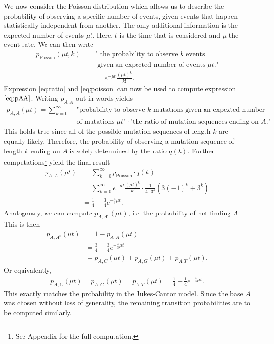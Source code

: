 \documentclass[12pt]{article}
\begin{document}
We now consider the Poisson distribution which allows us to describe the probability of observing a specific number of events, given events that happen statistically independent from another. The only additional information is the expected number of events $\mu t$. Here, $t$ is the time that is considered and $\mu$ the event rate. We can then write
\begin{align}
p_{\text{Poisson}}(\mu t,k) = &\text{" the probability to observe }k\text{ events}\nonumber\\
&\text{ given an expected number of events }\mu t\text{."} \nonumber \\
&= e^{-\mu t}\frac{(\mu t)^k}{k!} \label{eq:poisson}.
\end{align}
Expression \eqref{eq:ratio} and \eqref{eq:poisson} can now be used to compute expression $\eqref{eq:pAA}$. Writing $p_{A,A}$ out in words yields
\begin{align}
	p_{A,A}(\mu t) = \sum_{k=0}^\infty &\text{ "probability to observe $k$ mutations given an expexted number}\nonumber \\  &\text{  of mutations $\mu t$"} \nonumber
	 \cdot \text{"the ratio of mutation sequences ending on $A$."}
\end{align}
This holds true since all of the possible mutation sequences of length $k$ are equally likely. Therefore, the probability of observing a mutation sequence of length $k$ ending on $A$ is solely determined by the ratio $q(k)$. Further computations\footnote{See Appendix for the full computation.} yield the final result
\begin{align}
	p_{A,A}(\mu t) &= \sum_{k=0}^\infty p_{\text{Poisson}} \cdot  q(k) \nonumber
	\\
	&= \sum_{k=0}^\infty e^{-\mu t}\frac{(\mu t)^k}{k!} \cdot \frac{1}{4\cdot 3^k} \left(3(-1)^k+3^k\right) \nonumber	
	\\
	&= \frac14 + \frac34 e^{-\frac43 \mu t}. \label{eq:paa}
\end{align}
Analogously, we can compute $p_{A,A^c}(\mu t)$, i.e. the probability of not finding $A$. This is then
\begin{align*}
	p_{A,A^c}(\mu t) &= 1 - p_{A,A}(\mu t)  \\
	 &= \frac34 -\frac34 e^{-\frac43 \mu t} \\
	 &= p_{A,C}(\mu t) + p_{A,G}(\mu t) + p_{A,T}(\mu t).
\end{align*}
Or equivalently, 
\begin{align}
p_{A,C}(\mu t) = p_{A,G}(\mu t) = p_{A,T}(\mu t) = \frac14 -\frac14 e^{-\frac43 \mu t}.
\end{align}
This exactly matches the probability in the Jukes-Cantor model. Since the base $A$ was chosen without loss of generality, the remaining transition probabilities are to be computed similarly.
\end{document}
